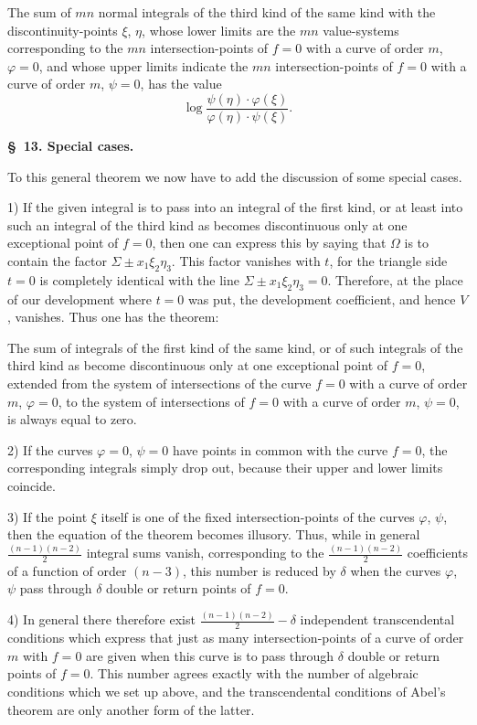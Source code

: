 \documentclass[10pt]{article}
\begin{document}
The sum of $mn$ normal integrals of the third kind of the same kind with the discontinuity-points $\xi$, $\eta$, whose lower limits are the $mn$ value-systems corresponding to the $mn$ intersection-points of $f=0$ with a curve of order $m$, $\varphi=0$, and whose upper limits indicate the $mn$ intersection-points of $f=0$ with a curve of order $m$, $\psi=0$, has the value
\[
\log\frac{\psi(\eta)\cdot\varphi(\xi)}{\varphi(\eta)\cdot\psi(\xi)}.
\]

\begin{center}
{\bfseries \S\ 13. Special cases.}
\end{center}

To this general theorem we now have to add the discussion of some special cases.

1) If the given integral is to pass into an integral of the first kind, or at least into such an integral of the third kind as becomes discontinuous only at one exceptional point of $f=0$, then one can express this by saying that $\Omega$ is to contain the factor $\Sigma\pm x_1\xi_2\eta_3$. This factor vanishes with $t$, for the triangle side $t=0$ is completely identical with the line $\Sigma\pm x_1\xi_2\eta_3=0$. Therefore, at the place of our development where $t=0$ was put, the development coefficient, and hence $V$, vanishes. Thus one has the theorem:

The sum of integrals of the first kind of the same kind, or of such integrals of the third kind as become discontinuous only at one exceptional point of $f=0$, extended from the system of intersections of the curve $f=0$ with a curve of order $m$, $\varphi=0$, to the system of intersections of $f=0$ with a curve of order $m$, $\psi=0$, is always equal to zero.

2) If the curves $\varphi=0$, $\psi=0$ have points in common with the curve $f=0$, the corresponding integrals simply drop out, because their upper and lower limits coincide.

3) If the point $\xi$ itself is one of the fixed intersection-points of the curves $\varphi$, $\psi$, then the equation of the theorem becomes illusory. Thus, while in general $\frac{(n-1)(n-2)}{2}$ integral sums vanish, corresponding to the $\frac{(n-1)(n-2)}{2}$ coefficients of a function of order $(n-3)$, this number is reduced by $\delta$ when the curves $\varphi$, $\psi$ pass through $\delta$ double or return points of $f=0$.

4) In general there therefore exist $\frac{(n-1)(n-2)}{2}-\delta$ independent transcendental conditions which express that just as many intersection-points of a curve of order $m$ with $f=0$ are given when this curve is to pass through $\delta$ double or return points of $f=0$. This number agrees exactly with the number of algebraic conditions which we set up above, and the transcendental conditions of Abel's theorem are only another form of the latter.
\end{document}
